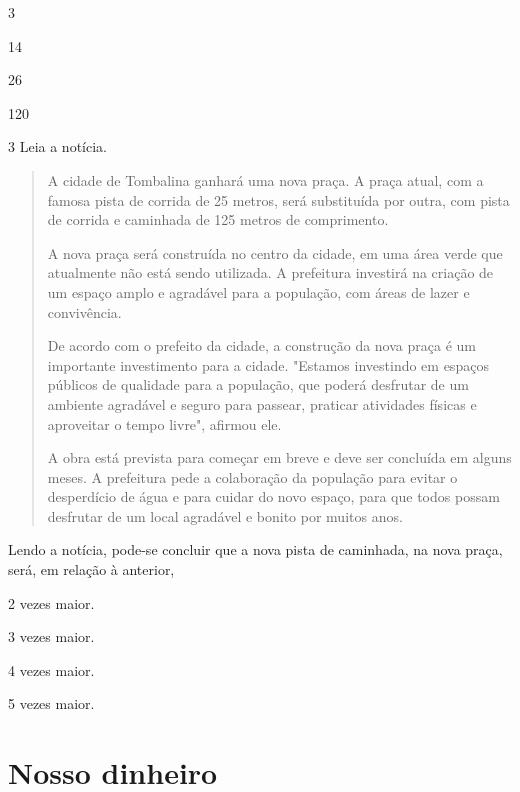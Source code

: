 \begin{escolha}
\item
  3
\item
  14
\item
  26
\item
  120
\end{escolha}


\num{3} Leia a notícia.

\begin{quote}
A cidade de Tombalina ganhará uma nova praça. A praça atual, com a famosa pista de corrida de 25 metros, será substituída por outra, com pista de corrida e caminhada de 125 metros de comprimento.

A nova praça será construída no centro da cidade, em uma área verde que atualmente não está sendo utilizada. A prefeitura investirá na criação de um espaço amplo e agradável para a população, com áreas de lazer e convivência.

De acordo com o prefeito da cidade, a construção da nova praça é um importante investimento para a cidade. "Estamos investindo em espaços públicos de qualidade para a população, que poderá desfrutar de um ambiente agradável e seguro para passear, praticar atividades físicas e aproveitar o tempo livre", afirmou ele.

A obra está prevista para começar em breve e deve ser concluída em alguns meses. A prefeitura pede a colaboração da população para evitar o desperdício de água e para cuidar do novo espaço, para que todos possam desfrutar de um local agradável e bonito por muitos anos.

\end{quote}

Lendo a notícia, pode-se concluir que a nova pista de caminhada, na nova praça, será, em relação à anterior,

\begin{escolha}
\item
  2 vezes maior.
\item
  3 vezes maior.
\item
  4 vezes maior.
\item
  5 vezes maior.
\end{escolha}

\chapter{Nosso dinheiro}


